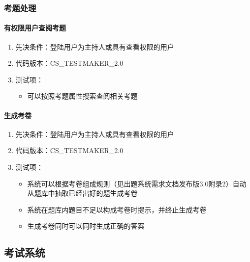 \documentclass[hyperref, a4paper]{ctexart}
\providecommand{\tightlist}{%
  \setlength{\itemsep}{0pt}\setlength{\parskip}{0pt}}
\let\oldparagraph\paragraph
\renewcommand{\paragraph}[1]{\oldparagraph{#1}\mbox{}}
\begin{document}
\hypertarget{ux8003ux9898ux5904ux7406}{%
\subsubsection{考题处理}\label{ux8003ux9898ux5904ux7406}}

\hypertarget{ux6709ux6743ux9650ux7528ux6237ux67e5ux9605ux8003ux9898}{%
\paragraph{有权限用户查阅考题}\label{ux6709ux6743ux9650ux7528ux6237ux67e5ux9605ux8003ux9898}}

\begin{enumerate}
\def\labelenumi{\arabic{enumi}.}
\tightlist
\item
  先决条件：登陆用户为主持人或具有查看权限的用户
\item
  代码版本：CS\_TESTMAKER\_2.0
\item
  测试项：

  \begin{itemize}
  \tightlist
  \item
    可以按照考题属性搜索查阅相关考题
  \end{itemize}
\end{enumerate}

\hypertarget{ux751fux6210ux8003ux5377}{%
\paragraph{生成考卷}\label{ux751fux6210ux8003ux5377}}

\begin{enumerate}
\def\labelenumi{\arabic{enumi}.}
\tightlist
\item
  先决条件：登陆用户为主持人或具有查看权限的用户
\item
  代码版本：CS\_TESTMAKER\_2.0
\item
  测试项：

  \begin{itemize}
  \tightlist
  \item
    系统可以根据考卷组成规则（见出题系统需求文档发布版3.0附录2）自动从题库中抽取已经出好的题生成考卷
  \item
    系统在题库内题目不足以构成考卷时提示，并终止生成考卷
  \item
    生成考卷同时可以同时生成正确的答案
  \end{itemize}
\end{enumerate}

\hypertarget{ux8003ux8bd5ux7cfbux7edf}{%
\subsection{考试系统}\label{ux8003ux8bd5ux7cfbux7edf}}
\end{document}
